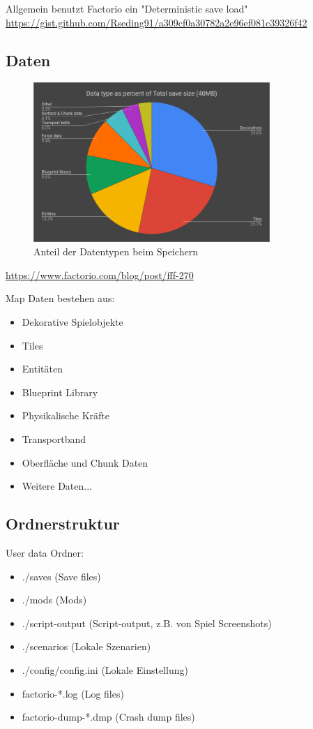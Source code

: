 Allgemein benutzt Factorio ein "Deterministic save load"
\url{https://gist.github.com/Rseding91/a309cf0a30782a2e96ef081c39326f42}


\subsection{Daten}

\begin{figure}[htp]
    \centering
    \includegraphics[width=0.8\textwidth]{images/factorio_save_statistic.png}
    \caption{Anteil der Datentypen beim Speichern}
    \label{fig:factorioSaveStatistic}
\end{figure}
\url{https://www.factorio.com/blog/post/fff-270}

Map Daten bestehen aus:
\begin{itemize}
    \item Dekorative Spielobjekte 
    \item Tiles 
    \item Entitäten
    \item Blueprint Library
    \item Physikalische Kräfte
    \item Transportband
    \item Oberfläche und Chunk Daten
    \item Weitere Daten...
\end{itemize}

\subsection{Ordnerstruktur}
User data Ordner:
\begin{itemize}
    \item ./saves (Save files)
    \item ./mods (Mods)
    \item ./script-output (Script-output, z.B. von Spiel Screenshots)
    \item ./scenarios (Lokale Szenarien)
    \item ./config/config.ini (Lokale Einstellung)
    \item factorio-*.log (Log files)
    \item factorio-dump-*.dmp (Crash dump files)
\end{itemize}

